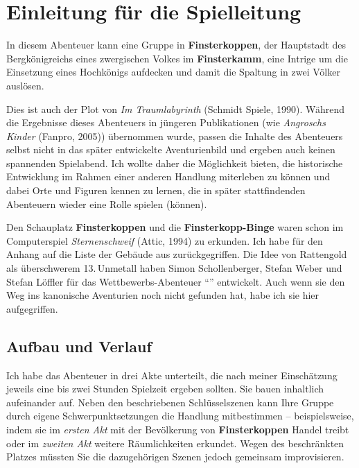 \spaltenanfang


\section*{Einleitung für die Spielleitung}
In diesem Abenteuer kann eine Gruppe in \textbf{Finsterkoppen},
der Hauptstadt des Bergkönigreichs eines zwergischen Volkes im \textbf{Finsterkamm},
eine Intrige um die Einsetzung eines Hochkönigs aufdecken und damit die Spaltung in zwei Völker auslösen.

Dies ist auch der Plot von \emph{Im Traumlabyrinth} (Schmidt Spiele, 1990).
Während die Ergebnisse dieses Abenteuers in jüngeren Publikationen (wie \emph{Angroschs Kinder} (Fanpro, 2005))
übernommen wurde, passen die Inhalte des Abenteuers selbst nicht in das später entwickelte Aven\-turien\-bild und ergeben auch keinen spannenden Spielabend.
Ich wollte daher die Möglichkeit bieten, die historische Entwicklung im Rahmen einer anderen Handlung miterleben zu können
und dabei Orte und Figuren kennen zu lernen, die in später stattfindenden Abenteuern wieder eine Rolle spielen (können).

Den Schauplatz \textbf{Finsterkoppen} und die \textbf{Finsterkopp-Binge} waren schon im Computerspiel \emph{Sternenschweif} (Attic, 1994) zu erkunden. %
Ich habe für den Anhang auf die Liste der Gebäude aus  zurückgegriffen.
Die Idee von Rattengold als überschwerem 13.\,Unmetall haben Simon Schollenberger, Stefan Weber und Stefan Löffler für das Wettbewerbs-Abenteuer \enquote{} entwickelt.
Auch wenn sie den Weg ins kanonische Aventurien noch nicht gefunden hat, habe ich sie hier aufgegriffen.


\subsection*{Aufbau und Verlauf}
Ich habe das Abenteuer in drei Akte unterteilt, die nach meiner Einschätzung jeweils eine bis zwei Stunden Spielzeit ergeben sollten.
Sie bauen inhaltlich aufeinander auf.
Neben den beschriebenen Schlüsselszenen kann Ihre Gruppe durch eigene Schwerpunktsetzungen die Handlung mitbestimmen -- beispielsweise,
indem sie im \emph{ersten Akt} mit der Bevölkerung von \textbf{Finsterkoppen} Handel treibt oder im \emph{zweiten Akt} weitere Räumlichkeiten erkundet.
Wegen des beschränkten Platzes müssten Sie die dazugehörigen Szenen jedoch gemeinsam improvisieren.

